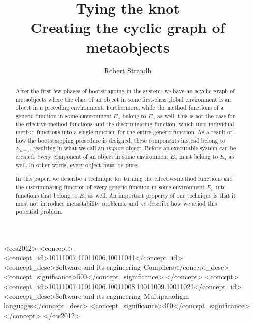 \documentclass[format=sigconf]{acmart}
\def\inputtex#1{}
\begin{document}
\title{Tying the knot\\{\smaller Creating the cyclic graph of \commonlisp{} metaobjects}}

\author{Robert Strandh}


\begin{abstract}
After the first few phases of bootstrapping in the \sicl{} system, we
have an acyclic graph of metaobjects where the class of an object in
some first-class global environment is an object in a preceding
environment.  Furthermore, while the method functions of a generic
function in some environment $E_n$ belong to $E_n$ as well, this is
not the case for the effective-method functions and the discriminating
function, which turn individual method functions into a single
function for the entire generic function.  As a result of how the
bootstrapping procedure is designed, these components instead belong
to $E_{n-1}$, resulting in what we call an \emph{impure} object.
Before an executable \sicl{} system can be created, every component of
an object in some environment $E_n$ must belong to $E_n$ as well.  In
other words, every object must be pure.

In this paper, we describe a technique for turning the
effective-method functions and the discriminating function of every
generic function in some environment $E_n$ into functions that belong
to $E_n$ as well.  An important property of our technique is that it
must not introduce metastability problems, and we describe how we
aviod this potential problem.
\end{abstract}

\begin{CCSXML}
<ccs2012>
<concept>
<concept_id>10011007.10011006.10011041</concept_id>
<concept_desc>Software and its engineering~Compilers</concept_desc>
<concept_significance>500</concept_significance>
</concept>
<concept>
<concept_id>10011007.10011006.10011008.10011009.10011021</concept_id>
<concept_desc>Software and its engineering~Multiparadigm languages</concept_desc>
<concept_significance>300</concept_significance>
</concept>
</ccs2012>
\end{CCSXML}



\maketitle


\inputtex{sec-introduction.tex}
\inputtex{sec-previous.tex}
\inputtex{sec-sicl.tex}
\inputtex{sec-our-method.tex}
\inputtex{sec-benefits.tex}
\inputtex{sec-conclusions.tex}
\inputtex{sec-acknowledgments.tex}


%

\end{document}
